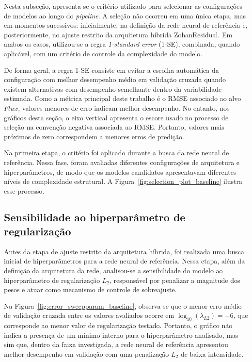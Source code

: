 Nesta subseção, apresenta-se o critério utilizado para selecionar as configurações de modelos ao longo do \textit{pipeline}. A seleção não ocorreu em uma única etapa, mas em momentos sucessivos: inicialmente, na definição da rede neural de referência e, posteriormente, no ajuste restrito da arquitetura híbrida ZohanResidual. Em ambos os casos, utilizou-se a regra \textit{1-standard error} (1-SE), combinada, quando aplicável, com um critério de controle da complexidade do modelo.

De forma geral, a regra 1-SE consiste em evitar a escolha automática da configuração com melhor desempenho médio em validação cruzada quando existem alternativas com desempenho semelhante dentro da variabilidade estimada. Como a métrica principal deste trabalho é o RMSE associado ao alvo $Flux$, valores menores de erro indicam melhor desempenho. No entanto, nos gráficos desta seção, o eixo vertical apresenta o escore usado no processo de seleção na convenção negativa associada ao RMSE. Portanto, valores mais próximos de zero correspondem a menores erros de predição.

Na primeira etapa, o critério foi aplicado durante a busca da rede neural de referência. Nessa fase, foram avaliadas diferentes configurações de arquitetura e hiperparâmetros, de modo que os modelos candidatos apresentavam diferentes níveis de complexidade estrutural. A Figura~\ref{fig:selection_plot_baseline} ilustra esse processo.
\subsection{Sensibilidade ao hiperparâmetro de regularização}

Antes da etapa de ajuste restrito da arquitetura híbrida, foi realizada uma busca inicial de hiperparâmetros para a rede neural de referência. Nessa etapa, além da definição da arquitetura da rede, analisou-se a sensibilidade do modelo ao hiperparâmetro de regularização $L_2$, responsável por penalizar a magnitude dos pesos e atuar como mecanismo de controle de sobreajuste.

Na Figura~\ref{fig:error_sweepparam_baseline}, observa-se que o menor erro médio de validação cruzada entre os valores avaliados ocorre em $\log_{10}(\lambda_{L2}) = -6$, que corresponde ao menor valor de regularização testado. Portanto, o gráfico não indica a presença de um mínimo interno para o hiperparâmetro analisado, mas sim que, dentro da faixa investigada, a rede neural de referência apresentou melhor desempenho em validação com uma penalização $L_2$ de baixa intensidade.


